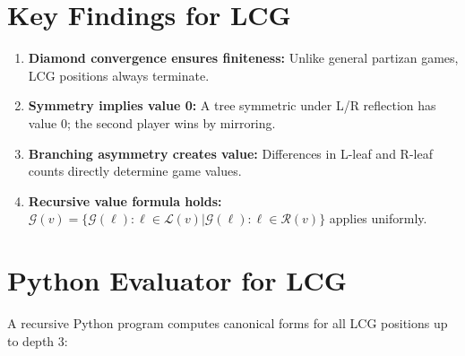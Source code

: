 \documentclass[10pt,a4paper,twocolumn]{article}
\newcommand{\Gv}[1]{\mathcal{G}(#1)}
\theoremstyle{plain}
\theoremstyle{definition}
\theoremstyle{remark}
\begin{document}
\section{Key Findings for LCG}

\begin{enumerate}
\item \textbf{Diamond convergence ensures finiteness:} Unlike general partizan games, LCG positions always terminate.
\item \textbf{Symmetry implies value 0:} A tree symmetric under L/R reflection has value 0; the second player wins by mirroring.
\item \textbf{Branching asymmetry creates value:} Differences in L-leaf and R-leaf counts directly determine game values.
\item \textbf{Recursive value formula holds:} $\Gv{v} = \{ \Gv{\ell} : \ell \in \mathcal{L}(v) | \Gv{\ell} : \ell \in \mathcal{R}(v) \}$ applies uniformly.
\end{enumerate}

\section{Python Evaluator for LCG}

A recursive Python program computes canonical forms for all LCG positions up to depth 3:
\end{document}

